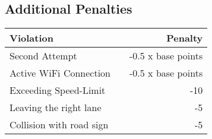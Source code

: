 {

\subsection*{Additional Penalties}
\begin{table}[H]
    \begin{tabular}{@{}lcr@{}}
        \toprule
        \textbf{Violation}       &  & \textbf{Penalty}   \\
        \midrule
        Second Attempt           &  & -0.5 x base points \\
        Active WiFi Connection   &  & -0.5 x base points \\
        Exceeding Speed-Limit    &  & -10                \\
        Leaving the right lane   &  & -5                 \\
        Collision with road sign &  & -5                 \\
        \bottomrule
    \end{tabular}
\end{table}
}
